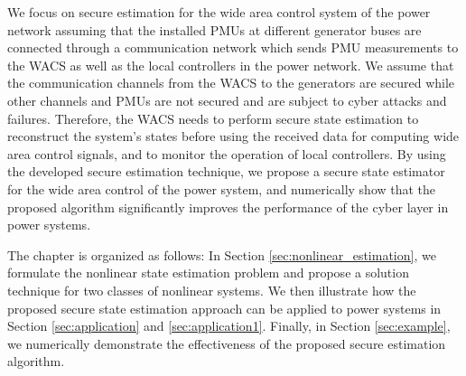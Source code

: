 We focus on secure estimation for the wide area control system of the power network assuming that the installed PMUs at different generator buses are connected through a communication network which sends PMU measurements to the WACS as well as the local controllers in the power network. We assume that the communication channels from the WACS to the generators are secured while other channels and PMUs are not secured and are subject to cyber attacks and failures. Therefore, the WACS needs to perform secure state estimation to reconstruct the system's states before using the received data for computing wide area control signals, and to monitor the operation of local controllers. By using the developed secure estimation technique, we propose a secure state estimator for the wide area control of the power system, and numerically show that the proposed algorithm significantly improves the performance of the cyber layer in power systems.

The chapter is organized as follows: In Section \ref{sec:nonlinear_estimation}, we formulate the nonlinear state estimation problem and propose a solution technique for two classes of nonlinear systems. We then illustrate how the proposed secure state estimation approach can be applied to power systems in Section \ref{sec:application} and \ref{sec:application1}. Finally, in Section \ref{sec:example}, we numerically demonstrate the effectiveness of the proposed secure estimation algorithm.


